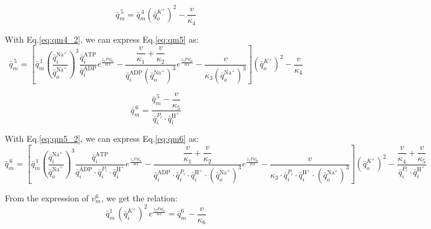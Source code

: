 \begin{equation}
      \label{eq:qm5}
\bar{q}_m^{\,5}
=
\bar{q}_m^{\,4}
\left(\bar{q}_o^{K^+}\right)^2
- \frac{v}{\kappa_4}
\end{equation}

With Eq.\ref{eq:qm4_2}, we can express Eq.\ref{eq:qm5} as:
\begin{equation}
      \label{eq:qm5_2}
\bar{q}_m^{\,5}
=
\left[
\bar{q}_m^{\,1}
\left(\frac{\bar{q}_i^{\mathrm{Na}^+}}{\bar{q}_o^{\mathrm{Na}^+}}\right)^3
\frac{\bar{q}_i^{\mathrm{ATP}}}{\bar{q}_i^{\mathrm{ADP}}}
e^{\frac{z_1 F u_m^{e}}{R T}}
-
\frac{\dfrac{v}{\kappa_1} + \dfrac{v}{\kappa_2}}{\bar{q}_i^{\mathrm{ADP}} \left(\bar{q}_o^{\mathrm{Na}^+}\right)^3}
e^{\frac{z_1 F u_m^{e}}{R T}}
-
\frac{v}{\kappa_3 \left(\bar{q}_o^{\mathrm{Na}^+}\right)^3}
\right]
\left(\bar{q}_o^{K^+}\right)^2
- \frac{v}{\kappa_4}
\end{equation}

\begin{equation}
      \label{eq:qm6}
\bar{q}_m^{\,6}
=
\frac{\bar{q}_m^{\,5} - \dfrac{v}{\kappa_5}}{\bar{q}_i^{P_i} \cdot \bar{q}_i^{\mathrm{H}^+}}
\end{equation}

With Eq.\ref{eq:qm5_2}, we can express Eq.\ref{eq:qm6} as:
\begin{equation}
      \label{eq:qm6_2}
\bar{q}_m^{\,6}
=
\left[
\bar{q}_m^{\,1}
\left(\frac{\bar{q}_i^{\mathrm{Na}^+}}{\bar{q}_o^{\mathrm{Na}^+}}\right)^3
\frac{\bar{q}_i^{\mathrm{ATP}}}{\bar{q}_i^{\mathrm{ADP}} \cdot \bar{q}_i^{P_i} \cdot \bar{q}_i^{\mathrm{H}^+}}
e^{\frac{z_1 F u_m^{e}}{R T}}
-
\frac{\dfrac{v}{\kappa_1} + \dfrac{v}{\kappa_2}}{\bar{q}_i^{\mathrm{ADP}} \cdot \bar{q}_i^{P_i} \cdot \bar{q}_i^{\mathrm{H}^+} \cdot \left(\bar{q}_o^{\mathrm{Na}^+}\right)^3}
e^{\frac{z_1 F u_m^{e}}{R T}}
-
\frac{v}{\kappa_3 \cdot \bar{q}_i^{P_i} \cdot \bar{q}_i^{\mathrm{H}^+} \cdot \left(\bar{q}_o^{\mathrm{Na}^+}\right)^3}
\right]
\left(\bar{q}_o^{K^+}\right)^2
-
\frac{\dfrac{v}{\kappa_4} + \dfrac{v}{\kappa_5}}{\bar{q}_i^{P_i} \cdot \bar{q}_i^{\mathrm{H}^+}}
\end{equation}

From the expression of $v_m^6$, we get the relation:
\begin{equation}
      \label{eq:qm1_qm6}
\bar{q}_m^{1}\,(\bar{q}_i^{K^+})^{2}\,e^{\frac{z_2 F u_m^{e}}{RT}}
= \bar{q}_m^{6}-\frac{v}{\kappa_6}
\end{equation}

